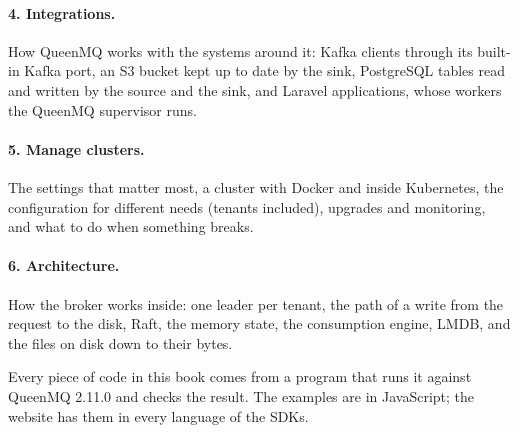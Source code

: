 \paragraph{4. Integrations.} How QueenMQ works with the systems around it: Kafka clients through
its built-in Kafka port, an S3 bucket kept up to date by the sink, PostgreSQL tables read and
written by the source and the sink, and Laravel applications, whose workers the QueenMQ supervisor
runs.

\paragraph{5. Manage clusters.} The settings that matter most, a cluster with Docker and inside
Kubernetes, the configuration for different needs (tenants included), upgrades and monitoring, and
what to do when something breaks.

\paragraph{6. Architecture.} How the broker works inside: one leader per tenant, the path of a write
from the request to the disk, Raft, the memory state, the consumption engine, LMDB, and the files
on disk down to their bytes.

\medskip
Every piece of code in this book comes from a program that runs it against QueenMQ 2.11.0 and checks
the result. The examples are in JavaScript; the website has them in every language of the SDKs.
